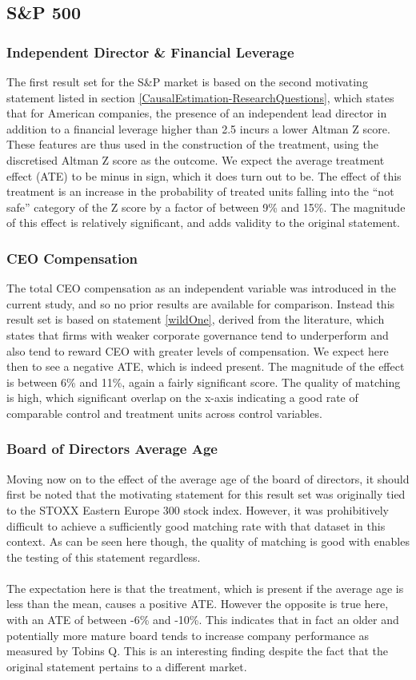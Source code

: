 \subsection{S\&P 500}
\subsubsection{Independent Director \& Financial Leverage}
{The first result set for the S\&P market is based on the second motivating statement listed in section \ref{CausalEstimation-ResearchQuestions}, which states that for American companies, the presence of an independent lead director in addition to a financial leverage higher than 2.5 incurs a lower Altman Z score. These features are thus used in the construction of the treatment, using the discretised Altman Z score as the outcome. We expect the average treatment effect (ATE) to be minus in sign, which it does turn out to be. The effect of this treatment is an increase in the probability of treated units falling into the ``not safe'' category of the Z score by a factor of between 9\% and 15\%. The magnitude of this effect is relatively significant, and adds validity to the original statement. }
\subsubsection{CEO Compensation}
{The total CEO compensation as an independent variable was introduced in the current study, and so no prior results are available for comparison. Instead this result set is based on statement \ref{wildOne}, derived from the literature, which states that firms with weaker corporate governance tend to underperform and also tend to reward CEO with greater levels of compensation. We expect here then to see a negative ATE, which is indeed present. The magnitude of the effect is between 6\% and 11\%, again a fairly significant score. The quality of matching is high, which significant overlap on the x-axis indicating a good rate of comparable control and treatment units across control variables. }
\subsubsection{Board of Directors Average Age}
{Moving now on to the effect of the average age of the board of directors, it should first be noted that the motivating statement for this result set was originally tied to the STOXX Eastern Europe 300 stock index. However, it was prohibitively difficult to achieve a sufficiently good matching rate with that dataset in this context. As can be seen here though, the quality of matching is good with enables the testing of this statement regardless.\\\\ The expectation here is that the treatment, which is present if the average age is less than the mean, causes a positive ATE. However the opposite is true here, with an ATE of between -6\% and -10\%. This indicates that in fact an older and potentially more mature board tends to increase company performance as measured by Tobins Q. This is an interesting finding despite the fact that the original statement pertains to a different market.}
